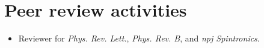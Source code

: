 \documentclass[a4paper,11pt]{article}
\makeatletter
\newcommand{\resumeProject}[4]{
\vspace{0.5mm}\item
    \begin{tabular*}{0.98\textwidth}[t]{l@{\extracolsep{\fill}}r}
        \textbf{#1} & \textit{\footnotesize{#3}} \\
        \footnotesize{\textit{#2}} & \footnotesize{#4}
    \end{tabular*}
    \vspace{-2.4mm}
}
\newcommand{\resumeSubHeadingListStart}{\begin{itemize}[leftmargin=*,labelsep=1mm]}
\newcommand{\resumeItemListStart}{\begin{itemize}[leftmargin=*,labelsep=1mm,itemsep=0.5mm]}
\newcommand{\resumeItemListEnd}{\end{itemize}\vspace{-2mm}}
\makeatother
\begin{document}
\section{\textbf{Peer review activities}}
\resumeItemListStart
\item Reviewer for \textit{Phys. Rev. Lett.}, \textit{Phys. Rev. B}, and \textit{npj Spintronics}. 
\resumeItemListEnd







\end{document}
